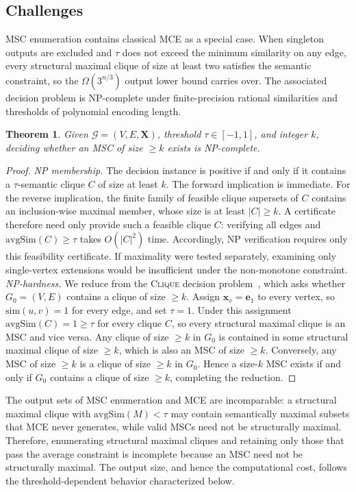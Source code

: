 \documentclass[sigconf, nonacm]{acmart}
\newtheorem{theorem}{Theorem}[section]
\newcommand{\stitle}[1]{\vspace{0.7ex} \noindent{\bf #1}}
\newcommand{\avgsim}{\mathrm{avgSim}}
\begin{document}
\subsection{Challenges}
\label{sec:challenges}
\stitle{Hardness.}
MSC enumeration contains classical MCE as a special case.  When singleton
outputs are excluded and $\tau$ does not exceed the minimum similarity on any
edge, every structural maximal clique of size at least two satisfies the
semantic constraint, so the $\Omega(3^{n/3})$ output lower bound carries over.
The associated decision problem is NP-complete under finite-precision rational
similarities and thresholds of polynomial encoding length.
\begin{theorem}
  \label{thm:np-complete}
Given $\mathcal{G}=(V,E,\mathbf{X})$, threshold $\tau\in[-1,1]$, and integer $k$,
  deciding whether an MSC of size $\geq k$ exists is \emph{NP-complete}.
\end{theorem}
\begin{proof}
  \textit{NP membership.}  The decision instance is positive if and only if
  it contains a $\tau$-semantic clique $C$ of size at least $k$.  The
  forward implication is immediate.  For the reverse implication, the finite
  family of feasible clique supersets of $C$ contains an inclusion-wise
  maximal member, whose size is at least $|C|\geq k$.  A certificate therefore
  need only provide such a feasible clique $C$: verifying all edges and
  $\avgsim(C)\geq\tau$ takes $O(|C|^2)$ time. Accordingly, NP verification
  requires only this feasibility certificate. If maximality were tested
  separately, examining only single-vertex extensions would be insufficient
  under the non-monotone constraint.
  \textit{NP-hardness.}  We reduce from the \textsc{Clique} decision
  problem~\cite{karp1972}, which asks whether $G_0=(V,E)$ contains a
  clique of size $\geq k$.
  Assign $\mathbf{x}_v = \mathbf{e}_1$ to every vertex, so
  $\mathrm{sim}(u,v) = 1$ for every edge, and set $\tau = 1$.
  Under this assignment $\avgsim(C) = 1 \geq \tau$ for every clique $C$,
  so every structural maximal clique is an MSC and vice versa.
  Any clique of size $\geq k$ in $G_0$ is contained in some structural
  maximal clique of size $\geq k$, which is also an MSC of size $\geq k$.
  Conversely, any MSC of size $\geq k$ is a clique of size $\geq k$
  in $G_0$.  Hence a size-$k$ MSC exists if and only if $G_0$ contains
  a clique of size $\geq k$, completing the reduction.
\end{proof}

The output sets of MSC enumeration and MCE are incomparable: a structural
maximal clique with $\avgsim(M)<\tau$ may contain semantically maximal subsets
that MCE never generates, while valid MSCs need not be structurally maximal.
Therefore, enumerating structural maximal cliques and retaining only those that
pass the average constraint is incomplete because an MSC need not be structurally maximal.
The output size, and hence the computational cost, follows the
threshold-dependent behavior characterized below.
\end{document}
